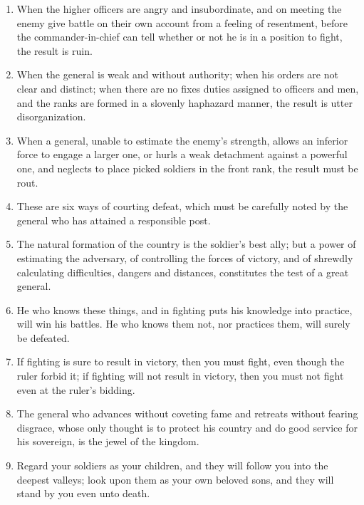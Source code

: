 \begin{enumerate}
  \item When the higher officers are angry and insubordinate, and on
    meeting the enemy give battle on their own account from a feeling
    of resentment, before the commander-in-chief can tell whether or
    not he is in a position to fight, the result is ruin.

  \item When the general is weak and without authority; when his
    orders are not clear and distinct; when there are no fixes duties
    assigned to officers and men, and the ranks are formed in a
    slovenly haphazard manner, the result is utter disorganization.

  \item When a general, unable to estimate the enemy's strength,
    allows an inferior force to engage a larger one, or hurls a weak
    detachment against a powerful one, and neglects to place picked
    soldiers in the front rank, the result must be rout.

  \item These are six ways of courting defeat, which must be carefully
    noted by the general who has attained a responsible post.

  \item The natural formation of the country is the soldier's best
    ally; but a power of estimating the adversary, of controlling the
    forces of victory, and of shrewdly calculating difficulties,
    dangers and distances, constitutes the test of a great general.

  \item He who knows these things, and in fighting puts his knowledge
    into practice, will win his battles. He who knows them not, nor
    practices them, will surely be defeated.

  \item If fighting is sure to result in victory, then you must fight,
    even though the ruler forbid it; if fighting will not result in
    victory, then you must not fight even at the ruler's bidding.

  \item The general who advances without coveting fame and retreats
    without fearing disgrace, whose only thought is to protect his
    country and do good service for his sovereign, is the jewel of the
    kingdom.

  \item Regard your soldiers as your children, and they will follow
    you into the deepest valleys; look upon them as your own beloved
    sons, and they will stand by you even unto death.


\end{enumerate}
